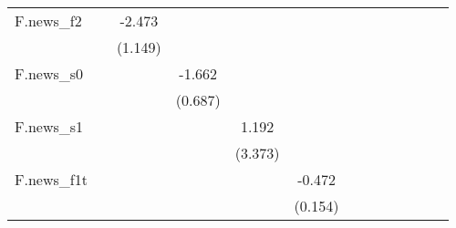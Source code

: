 {\begin{tabular}{l*{12}{c}}
\addlinespace
F.news\_f2   &                     &      -2.473\sym{**} &                     &                     &                     &                     &                     &                     &                     &                     &                     &                     \\
            &                     &     (1.149)         &                     &                     &                     &                     &                     &                     &                     &                     &                     &                     \\
\addlinespace
F.news\_s0   &                     &                     &      -1.662\sym{**} &                     &                     &                     &                     &                     &                     &                     &                     &                     \\
            &                     &                     &     (0.687)         &                     &                     &                     &                     &                     &                     &                     &                     &                     \\
\addlinespace
F.news\_s1   &                     &                     &                     &       1.192         &                     &                     &                     &                     &                     &                     &                     &                     \\
            &                     &                     &                     &     (3.373)         &                     &                     &                     &                     &                     &                     &                     &                     \\
\addlinespace
F.news\_f1t  &                     &                     &                     &                     &      -0.472\sym{***}&                     &                     &                     &                     &                     &                     &                     \\
            &                     &                     &                     &                     &     (0.154)         &                     &                     &                     &                     &                     &                     &                     \\

\end{tabular}}
